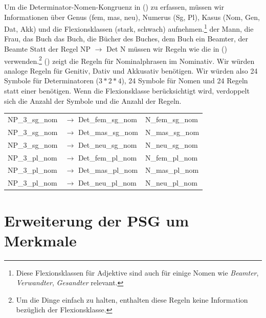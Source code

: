 Um die Determinator-Nomen-Kongruenz in () zu erfassen, müssen wir Informationen über Genus (fem, mas, neu),
Numerus (Sg, Pl), Kasus (Nom, Gen, Dat, Akk) und die Flexionsklassen (stark, schwach) aufnehmen.\footnote{%
Diese Flexionsklassen für Adjektive sind auch für einige Nomen wie \emph{Beamter},
\emph{Verwandter}, \emph{Gesandter} relevant.
}
\eal\settowidth{}
\ex
der Mann, die Frau, das Buch 
\ex
das Buch, die Bücher 
\ex
des Buches, dem Buch 
\ex{}
ein Beamter, der Beamte 
\zl
Statt der Regel NP $\to$ Det N müssen wir Regeln wie die in () verwenden.\footnote{%
  Um die Dinge einfach zu halten, enthalten diese Regeln keine Information bezüglich der Flexionsklasse.
}
() zeigt die Regeln für Nominalphrasen im Nominativ. Wir würden analoge Regeln für Genitiv,
Dativ und Akkusativ benötigen. Wir würden also 24 Symbole für Determinatoren ($3*2*4$), 24 Symbole für Nomen und
24 Regeln statt einer benötigen. Wenn die Flexionsklasse berücksichtigt wird, verdoppelt sich die Anzahl der Symbole und die
Anzahl der Regeln.
\ea
\begin{tabular}[t]{@{}l@{ }l@{~~}l}
NP\_3\_sg\_nom  & $\to$ Det\_fem\_sg\_nom & N\_fem\_sg\_nom \\
NP\_3\_sg\_nom  & $\to$ Det\_mas\_sg\_nom & N\_mas\_sg\_nom \\
NP\_3\_sg\_nom  & $\to$ Det\_neu\_sg\_nom & N\_neu\_sg\_nom \\
NP\_3\_pl\_nom  & $\to$ Det\_fem\_pl\_nom & N\_fem\_pl\_nom \\
NP\_3\_pl\_nom  & $\to$ Det\_mas\_pl\_nom & N\_mas\_pl\_nom \\
NP\_3\_pl\_nom  & $\to$ Det\_neu\_pl\_nom & N\_neu\_pl\_nom \\
\end{tabular}
\z

\section{Erweiterung der PSG um Merkmale}
\label{sec-PSG-Merkmale}


